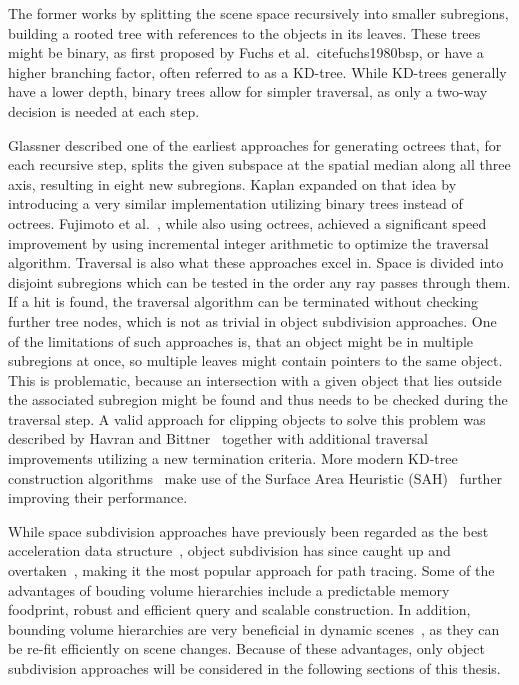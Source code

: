 The former works by splitting the scene space recursively into smaller subregions, building a rooted tree with references to the objects in its leaves. These trees might be binary, as first proposed by Fuchs et al.~cite{fuchs1980bsp}, or have a higher branching factor, often referred to as a KD-tree. While KD-trees generally have a lower depth, binary trees allow for simpler traversal, as only a two-way decision is needed at each step.

Glassner\cite{glassner_space_1984} described one of the earliest approaches for generating octrees that, for each recursive step, splits the given subspace at the spatial median along all three axis, resulting in eight new subregions. Kaplan\cite{kaplan_use_1985} expanded on that idea by introducing a very similar implementation utilizing binary trees instead of octrees. Fujimoto et al.~\cite{fujimoto_arts_1986}, while also using octrees, achieved a significant speed improvement by using incremental integer arithmetic to optimize the traversal algorithm. Traversal is also what these approaches excel in. Space is divided into disjoint subregions which can be tested in the order any ray passes through them. If a hit is found, the traversal algorithm can be terminated without checking further tree nodes, which is not as trivial in object subdivision approaches. One of the limitations of such approaches is, that an object might be in multiple subregions at once, so multiple leaves might contain pointers to the same object. This is problematic, because an intersection with a given object that lies outside the associated subregion might be found and thus needs to be checked during the traversal step. A valid approach for clipping objects to solve this problem was described by Havran and Bittner~\cite{Havran02onimproving} together with additional traversal improvements utilizing a new termination criteria. More modern KD-tree construction algorithms~\cite{roccia2012kdtree,choi2010sahKdTree,wu2011sahKdTree} make use of the Surface Area Heuristic (SAH)~\cite{macdonald_heuristics_1990} further improving their performance.

While space subdivision approaches have previously been regarded as the best acceleration data structure~\cite{havrand2000comparison}, object subdivision has since caught up and overtaken~\cite{vinkler2015comparison}, making it the most popular approach for path tracing. 
Some of the advantages of bouding volume hierarchies include a predictable memory foodprint, robust and efficient query and scalable construction. In addition, bounding volume hierarchies are very beneficial in dynamic scenes~\cite{wald_ray_2007}, as they can be re-fit efficiently on scene changes. Because of these advantages, only object subdivision approaches will be considered in the following sections of this thesis.

